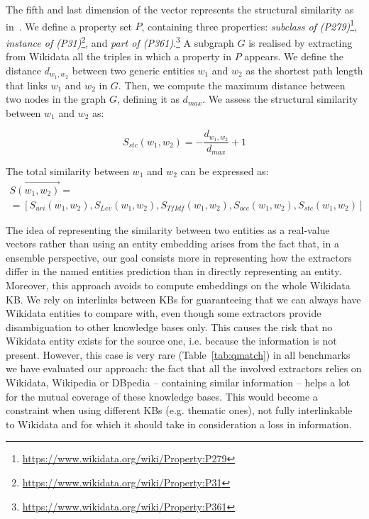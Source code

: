\documentclass{llncs}
\newcommand{\tabref}[1]{\mbox{Table~\ref{#1}}}
\begin{document}
The fifth and last dimension of the vector represents the structural similarity as in~\cite{CollaborativeKnowledgeBaseEmbeddingforRecommenderSystems}. We define a property set $P$, containing three properties:
\textit{subclass of (P279)}\footnote{\url{https://www.wikidata.org/wiki/Property:P279}},
\textit{instance of (P31)}\footnote{\url{https://www.wikidata.org/wiki/Property:P31}}, and \textit{part of (P361)}.\footnote{\url{https://www.wikidata.org/wiki/Property:P361}}
A subgraph $G$ is realised by extracting from Wikidata all the triples in which a property in $P$ appears. We define the distance $d_{w_1,w_2}$ between two generic entities $w_1$ and $w_2$ as the shortest path length that links $w_1$ and $w_2$ in $G$. Then, we compute the maximum distance between two nodes in the graph $G$, defining it as $d_{max}$. We assess the structural similarity between $w_1$ and $w_2$ as:

$$S_{stc}(w_1,w_2) = -\frac{d_{w_1,w_2}}{d_{max}} + 1 $$

The total similarity between $w_1$ and $w_2$ can be expressed as:
\begin{equation}
\begin{gathered}
 \vec{S(w_1,w_2)} = \\
 = [S_{uri}(w_1,w_2),S_{Lev}(w_1,w_2),S_{TfIdf}(w_1,w_2),S_{occ}(w_1,w_2),S_{stc}(w_1,w_2)]
\end{gathered}
\end{equation}

The idea of representing the similarity between two entities as a real-value vectors rather than using an entity embedding arises from the fact that, in a ensemble perspective, our goal consists more in representing how the extractors differ in the named entities prediction than in directly representing an entity. Moreover, this approach avoids to compute embeddings on the whole Wikidata KB. We rely on interlinks between KBs for guaranteeing that we can always have Wikidata entities to compare with, even though some extractors provide disambiguation to other knowledge bases only. This causes the risk that no Wikidata entity exists for the source one, i.e. because the information is not present. However, this case is very rare (\tabref{tab:qmatch}) in all benchmarks we have evaluated our approach: the fact that all the involved extractors relies on Wikidata, Wikipedia or DBpedia -- containing similar information -- helps a lot for the mutual coverage of these knowledge bases. This would become a constraint when using different KBs (e.g. thematic ones), not fully interlinkable to Wikidata and for which it should take in consideration a loss in information.
\end{document}
